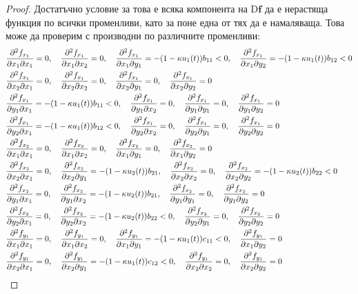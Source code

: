 \begin{proof}
Достатъчно условие за това е всяка компонента на $\mathrm{D}\mathbf{f}$ да е нерастяща функция по всички променливи, като за поне една от тях да е намаляваща. Това може да проверим с производни по различните променливи:
{\allowdisplaybreaks
  \begin{align*}
    &\pdv{f_{x_1}}{x_1}{x_1} = 0, \quad
    \pdv{f_{x_1}}{x_1}{x_2} = 0, \quad
    \pdv{f_{x_1}}{x_1}{y_1} = -(1-\kappa u_1(t)) b_{11} < 0, \quad
    \pdv{f_{x_1}}{x_1}{y_2} = -(1-\kappa u_1(t)) b_{12} < 0 \\
    &\pdv{f_{x_1}}{x_2}{x_1} = 0, \quad
    \pdv{f_{x_1}}{x_2}{x_2} = 0, \quad
    \pdv{f_{x_1}}{x_2}{y_1} = 0, \quad
    \pdv{f_{x_1}}{x_2}{y_2} = 0 \\
    &\pdv{f_{x_1}}{y_1}{x_1} = -(1-\kappa u_1(t)) b_{11} < 0, \quad
    \pdv{f_{x_1}}{y_1}{x_2} = 0, \quad
    \pdv{f_{x_1}}{y_1}{y_1} = 0, \quad
    \pdv{f_{x_1}}{y_1}{y_2} = 0 \\
    &\pdv{f_{x_1}}{y_2}{x_1} = -(1-\kappa u_1(t)) b_{12} < 0, \quad
    \pdv{f_{x_1}}{y_2}{x_2} = 0, \quad
    \pdv{f_{x_1}}{y_2}{y_1} = 0, \quad
    \pdv{f_{x_1}}{y_2}{y_2} = 0 \\
    &\pdv{f_{x_2}}{x_1}{x_1} = 0, \quad
    \pdv{f_{x_2}}{x_1}{x_2} = 0, \quad
    \pdv{f_{x_2}}{x_1}{y_1} = 0, \quad
    \pdv{f_{x_2}}{x_1}{y_2} = 0 \\
    &\pdv{f_{x_2}}{x_2}{x_1} = 0, \quad
    \pdv{f_{x_2}}{x_2}{y_1} = -(1-\kappa u_2(t)) b_{21}, \quad
    \pdv{f_{x_2}}{x_2}{x_2} = 0, \quad
    \pdv{f_{x_2}}{x_2}{y_2} = -(1-\kappa u_2(t)) b_{22} < 0 \\
    &\pdv{f_{x_2}}{y_1}{x_1} = 0, \quad
    \pdv{f_{x_2}}{y_1}{x_2} = -(1-\kappa u_2(t)) b_{21}, \quad
    \pdv{f_{x_2}}{y_1}{y_1} = 0, \quad
    \pdv{f_{x_2}}{y_1}{y_2} = 0 \\
    &\pdv{f_{x_2}}{y_2}{x_1} = 0, \quad
    \pdv{f_{x_2}}{y_2}{x_2} = -(1-\kappa u_2(t)) b_{22} < 0, \quad
    \pdv{f_{x_2}}{y_2}{y_1} = 0, \quad
    \pdv{f_{x_2}}{y_2}{y_2} = 0 \\
    &\pdv{f_{y_1}}{x_1}{x_1} = 0, \quad
    \pdv{f_{y_1}}{x_1}{x_2} = 0, \quad
    \pdv{f_{y_1}}{x_1}{y_1} = -(1-\kappa u_1(t))c_{11} < 0, \quad
    \pdv{f_{y_1}}{x_1}{y_2} = 0 \\
    &\pdv{f_{y_1}}{x_2}{x_1} = 0, \quad
    \pdv{f_{y_1}}{x_2}{y_1} = -(1-\kappa u_1(t))c_{12} < 0, \quad
    \pdv{f_{y_1}}{x_2}{x_2} = 0, \quad
    \pdv{f_{y_1}}{x_2}{y_2} = 0 \\

\end{align*}}
\end{proof}
